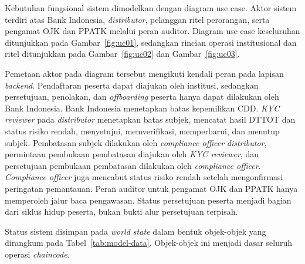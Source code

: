 Kebutuhan fungsional sistem dimodelkan dengan diagram use case. Aktor sistem
terdiri atas Bank Indonesia, \textit{distributor},
pelanggan ritel perorangan, serta pengamat OJK dan PPATK melalui peran auditor. Diagram use case keseluruhan
ditunjukkan pada Gambar~\ref{fig:uc01}, sedangkan rincian operasi
institusional dan ritel ditunjukkan pada Gambar~\ref{fig:uc02} dan
Gambar~\ref{fig:uc03}.



Pemetaan aktor pada diagram tersebut mengikuti kendali peran pada lapisan
\textit{backend}. Pendaftaran peserta dapat diajukan oleh institusi, sedangkan
persetujuan, penolakan, dan \textit{offboarding} peserta hanya dapat
dilakukan oleh Bank Indonesia. Bank Indonesia menetapkan batas kepemilikan CDD. \textit{KYC reviewer} pada \textit{distributor} menetapkan batas subjek, mencatat hasil DTTOT dan status risiko rendah, menyetujui, memverifikasi, memperbarui, dan menutup subjek. Pembatasan subjek dilakukan oleh \textit{compliance officer} \textit{distributor}, permintaan pembukaan pembatasan diajukan oleh \textit{KYC reviewer}, dan persetujuan pembukaan pembatasan dilakukan oleh \textit{compliance officer}. \textit{Compliance officer} juga mencabut status risiko rendah setelah mengonfirmasi peringatan pemantauan. Peran auditor untuk pengamat OJK dan PPATK hanya memperoleh
jalur baca pengawasan. Status persetujuan peserta menjadi bagian dari siklus
hidup peserta, bukan bukti alur persetujuan terpisah.

Status sistem disimpan pada \textit{world state} dalam bentuk objek-objek yang
dirangkum pada Tabel~\ref{tab:model-data}. Objek-objek ini menjadi dasar seluruh
operasi \textit{chaincode}.


